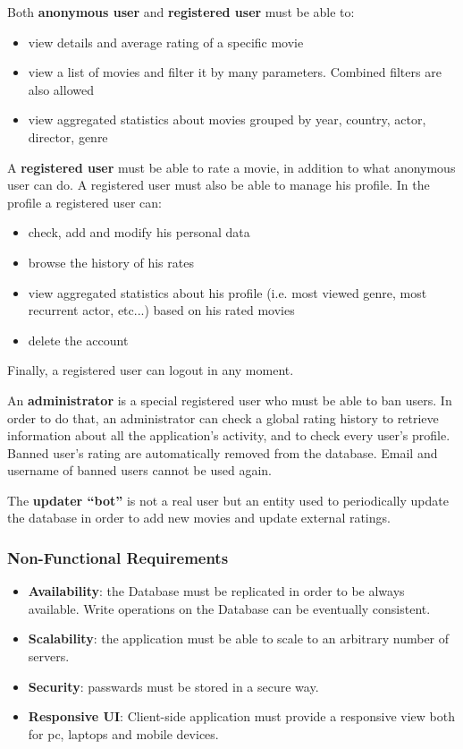 \documentclass[11pt]{article}
\begin{document}
Both \textbf{anonymous user} and \textbf{registered user} must be able to:
\begin{itemize}
	\item view details and average rating of a specific movie
	\item view a list of movies and filter it by many parameters. Combined filters 
	are also allowed
	\item view aggregated statistics about movies grouped by year, country, actor,
	director, genre 
\end{itemize}

A \textbf{registered user} must be able to rate a movie, in addition to what anonymous
user can do. A registered user must also be able to manage his profile. In the profile a
registered user can:
\begin{itemize}
	\item check, add and modify his personal data
	\item browse the history of his rates
	\item view aggregated statistics about his profile (i.e. most viewed genre,
	most recurrent actor, etc...) based on his rated movies
	\item delete the account
\end{itemize}
Finally, a registered user can logout in any moment.

An \textbf{administrator} is a special registered user who must be able to ban users.
In order to do that, an administrator can check a global rating history to retrieve information
about all the application's activity, and to check every user's profile.
Banned user's rating are automatically removed from the database. Email and username
of banned users cannot be used again.

The \textbf{updater ``bot''} is not a real user but an entity used to periodically update the database in order to add new movies and update external ratings. 

\subsubsection{Non-Functional Requirements}
\begin{itemize}
	\item \textbf{Availability}: the Database must be replicated in order to be always available.
	Write operations on the Database can be eventually consistent.
	\item \textbf{Scalability}: the application must be able to scale to an arbitrary number of servers.
	\item \textbf{Security}: passwards must be stored in a secure way.
	\item \textbf{Responsive UI}: Client-side application must provide a responsive view both for pc, 
	laptops and mobile devices.
\end{itemize}
\end{document}
